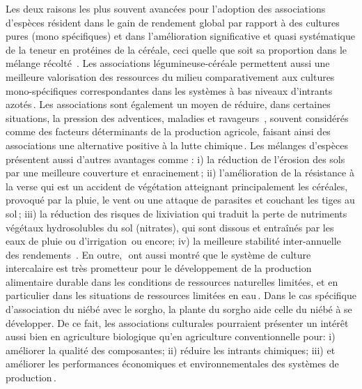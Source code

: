 \documentclass[a4paper,11pt]{article}
\begin{document}
Les deux raisons les plus souvent avancées pour l'adoption des
associations d'espèces résident dans le gain de rendement global par
rapport à des cultures pures (mono spécifiques) et dans l'amélioration
significative et quasi systématique de la teneur en protéines de la
céréale, ceci quelle que soit sa proportion dans le mélange récolté
\,\cite{Jensen_1996}. Les associations légumineuse-céréale permettent
aussi une meilleure valorisation des ressources du milieu
comparativement aux cultures mono-spécifiques correspondantes dans les
systèmes à bas niveaux d'intrants azotés\,\cite{Bedoussac_2010}. Les
associations sont également un moyen de réduire, dans certaines
situations, la pression des adventices, maladies et ravageurs
\,\cite{Altieri_1999}, souvent considérés comme des facteurs
déterminants de la production agricole, faisant ainsi des associations
une alternative positive à la lutte
chimique\,\cite{Hauggaard_2001}. Les mélanges d'espèces présentent
aussi d'autres avantages comme : i) la réduction de l'érosion des sols
par une meilleure couverture et enracinement\,\cite{Zougmore_1998};
ii) l'amélioration de la résistance à la verse qui est un accident de
végétation atteignant principalement les céréales, provoqué par la
pluie, le vent ou une attaque de parasites et couchant les tiges au
sol\,\cite{Anil_1998}; iii) la réduction des risques de lixiviation
qui traduit la perte de nutriments végétaux hydrosolubles
du sol (nitrates), qui sont dissous et entraînés par les eaux de pluie ou
d'irrigation\,\cite{CorreHellou_2005} ou encore; iv) la meilleure
stabilité inter-annuelle des rendements \,\cite{Lithourgidis_2006}. En
outre,\,\citeauthor{Chu_2004}\,\citeyear{Chu_2004} ont aussi montré
que le système de culture intercalaire est très prometteur pour le
développement de la production alimentaire durable dans les conditions
de ressources naturelles limitées, et en particulier dans les
situations de ressources limitées en eau\,\cite{Tsubo_2005}. Dans le
cas spécifique d'association du niébé avec le sorgho, la plante du
sorgho aide celle du niébé à se développer. De ce fait, les
associations culturales pourraient présenter un intérêt aussi bien en
agriculture biologique qu'en agriculture conventionnelle pour: i)
améliorer la qualité des composantes; ii) réduire les intrants
chimiques; iii) et améliorer les performances économiques et
environnementales des systèmes de
production\,\cite{Koulibi_FideleZONGO}.
 
\end{document}
